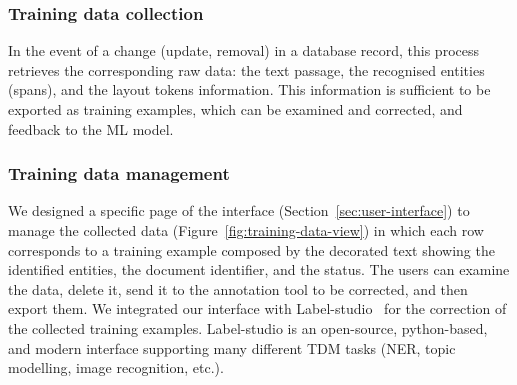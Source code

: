 \documentclass[]{interact}
\theoremstyle{plain} %
\theoremstyle{definition}
\theoremstyle{remark}
\begin{document}
\subsubsection{Training data collection}
In the event of a change (update, removal) in a database record, this process retrieves the corresponding raw data: the text passage, the recognised entities (spans), and the layout tokens information. 
This information is sufficient to be exported as training examples, which can be examined and corrected, and feedback to the ML model. 

\subsubsection{Training data management}
We designed a specific page of the interface (Section~\ref{sec:user-interface}) to manage the collected data (Figure~\ref{fig:training-data-view}) in which each row corresponds to a training example composed by the decorated text showing the identified entities, the document identifier, and the status. 
The users can examine the data, delete it, send it to the annotation tool to be corrected, and then export them.
We integrated our interface with Label-studio~\cite{Label_Studio} for the correction of the collected training examples. 
Label-studio is an open-source, python-based, and modern interface supporting many different TDM tasks (NER, topic modelling, image recognition, etc.). 
\end{document}
